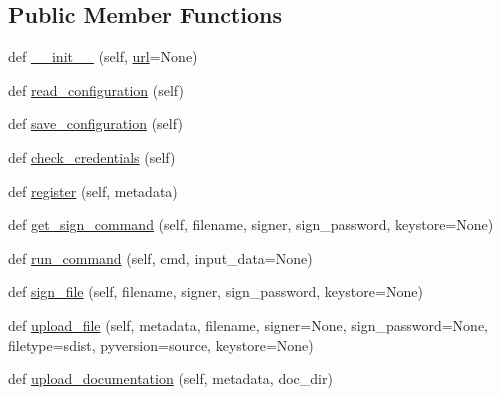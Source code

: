 \subsection*{Public Member Functions}
\begin{DoxyCompactItemize}
\item 
def \hyperlink{classpip_1_1__vendor_1_1distlib_1_1index_1_1PackageIndex_a46cfcfcec144286103d44bfcc090961b}{\+\_\+\+\_\+init\+\_\+\+\_\+} (self, \hyperlink{classpip_1_1__vendor_1_1distlib_1_1index_1_1PackageIndex_a89367ad4a25e519fa60da0c73379a523}{url}=None)
\item 
def \hyperlink{classpip_1_1__vendor_1_1distlib_1_1index_1_1PackageIndex_aa5372b63dc1e8726db61135b7a1c1907}{read\+\_\+configuration} (self)
\item 
def \hyperlink{classpip_1_1__vendor_1_1distlib_1_1index_1_1PackageIndex_a2c5293c68e845790c16bafefb7393d05}{save\+\_\+configuration} (self)
\item 
def \hyperlink{classpip_1_1__vendor_1_1distlib_1_1index_1_1PackageIndex_aa4b7c1c92f448f53bd03767f05e3656c}{check\+\_\+credentials} (self)
\item 
def \hyperlink{classpip_1_1__vendor_1_1distlib_1_1index_1_1PackageIndex_a27a2c45326f805aaa0cd980104d1ad66}{register} (self, metadata)
\item 
def \hyperlink{classpip_1_1__vendor_1_1distlib_1_1index_1_1PackageIndex_a87351a65052ac2a0b4d3e9009bc181b7}{get\+\_\+sign\+\_\+command} (self, filename, signer, sign\+\_\+password, keystore=None)
\item 
def \hyperlink{classpip_1_1__vendor_1_1distlib_1_1index_1_1PackageIndex_a54f629e14238e91a7826fce4199bcd10}{run\+\_\+command} (self, cmd, input\+\_\+data=None)
\item 
def \hyperlink{classpip_1_1__vendor_1_1distlib_1_1index_1_1PackageIndex_a302df05dc81ec9d37ebb5e89972c59d8}{sign\+\_\+file} (self, filename, signer, sign\+\_\+password, keystore=None)
\item 
def \hyperlink{classpip_1_1__vendor_1_1distlib_1_1index_1_1PackageIndex_ac0d22630f5bafe54842ca287b142ea84}{upload\+\_\+file} (self, metadata, filename, signer=None, sign\+\_\+password=None, filetype=\textquotesingle{}sdist\textquotesingle{}, pyversion=\textquotesingle{}source\textquotesingle{}, keystore=None)
\item 
def \hyperlink{classpip_1_1__vendor_1_1distlib_1_1index_1_1PackageIndex_adc5a022e3889341bc67a8fed1a4de77a}{upload\+\_\+documentation} (self, metadata, doc\+\_\+dir)
\item 

\end{DoxyCompactItemize}
